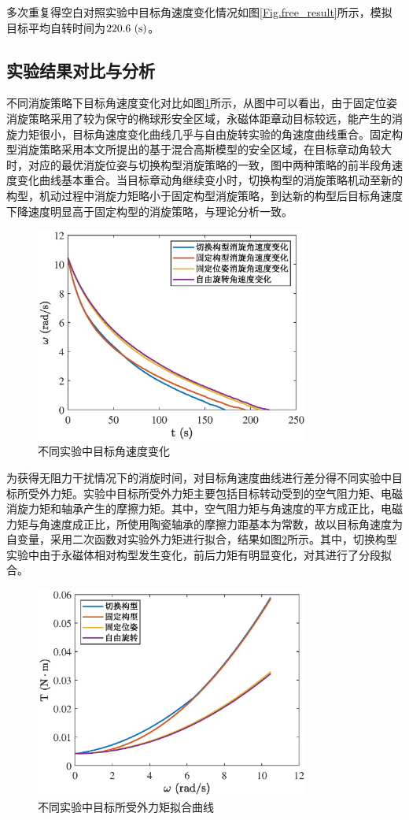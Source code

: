 \documentclass[lang=chs, degree=master, blindreview=false, winfonts=true]{yanputhesis}
\begin{document}
多次重复得空白对照实验中目标角速度变化情况如图\ref{Fig.free_result}所示，模拟目标平均自转时间为$220.6\ \rm{(s)}$。



\subsection{实验结果对比与分析}
不同消旋策略下目标角速度变化对比如图\ref{fig:detumtime_compare}所示，从图中可以看出，由于固定位姿消旋策略采用了较为保守的椭球形安全区域，永磁体距章动目标较远，能产生的消旋力矩很小，目标角速度变化曲线几乎与自由旋转实验的角速度曲线重合。固定构型消旋策略采用本文所提出的基于混合高斯模型的安全区域，在目标章动角较大时，对应的最优消旋位姿与切换构型消旋策略的一致，图中两种策略的前半段角速度变化曲线基本重合。当目标章动角继续变小时，切换构型的消旋策略机动至新的构型，机动过程中消旋力矩略小于固定构型消旋策略，到达新的构型后目标角速度下降速度明显高于固定构型的消旋策略，与理论分析一致。
\begin{figure}[htb!]
	\centering
	\includegraphics[width = 3.55in]{picture/detumtime_compare.eps}
	\caption{不同实验中目标角速度变化}
	\label{fig:detumtime_compare}
\end{figure}

为获得无阻力干扰情况下的消旋时间，对目标角速度曲线进行差分得不同实验中目标所受外力矩。实验中目标所受外力矩主要包括目标转动受到的空气阻力矩、电磁消旋力矩和轴承产生的摩擦力矩。其中，空气阻力矩与角速度的平方成正比，电磁力矩与角速度成正比，所使用陶瓷轴承的摩擦力距基本为常数，故以目标角速度为自变量，采用二次函数对实验外力矩进行拟合，结果如图\ref{fig:exp_tor}所示。其中，切换构型实验中由于永磁体相对构型发生变化，前后力矩有明显变化，对其进行了分段拟合。
\begin{figure}[htb!]
	\centering
	\includegraphics[width = 3.55in]{picture/exp_tor.eps}
	\caption{不同实验中目标所受外力矩拟合曲线}
	\label{fig:exp_tor}
\end{figure}
\end{document}
